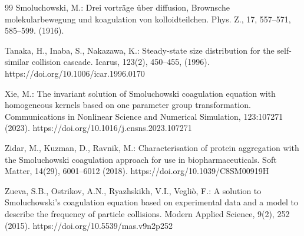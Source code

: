 \documentclass[a4paper,11pt]{article}
\begin{document}
\begin{thebibliography}{99}
Smoluchowski, M.: Drei vortr\"{a}ge \"{u}ber diffusion, Brownsche molekularbewegung und koagulation von kolloidteilchen. Phys. Z., 17, 557–571, 585–599. (1916).

Tanaka, H., Inaba, S., Nakazawa, K.: Steady-state size distribution for the self-similar
collision cascade. Icarus, 123(2), 450–455, (1996). https://doi.org/10.1006/icar.1996.0170

Xie, M.: The invariant solution of Smoluchowski coagulation equation with homogeneous kernels based on one parameter group transformation. Communications in Nonlinear Science and Numerical Simulation, 123:107271 (2023). https://doi.org/10.1016/j.cnsns.2023.107271

Zidar, M., Kuzman, D., Ravnik, M.: Characterisation of protein aggregation with
the Smoluchowski coagulation approach for use in biopharmaceuticals. Soft Matter,
14(29), 6001–6012 (2018).
https://doi.org/10.1039/C8SM00919H

Zueva, S.B., Ostrikov, A.N., Ryazhskikh, V.I., Vegli\`{o}, F.: A solution to Smoluchowski’s coagulation equation based on experimental data and a model to describe the frequency of particle collisions. Modern Applied Science, 9(2), 252 (2015).
https://doi.org/10.5539/mas.v9n2p252
\end{thebibliography}
\end{document}
